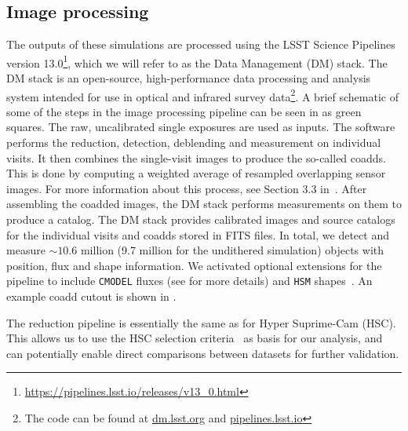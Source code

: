 \documentclass[\docopts]{\docclass}
\begin{document}
\subsection{Image processing}
\label{sec:image_processing_pipeline}

The outputs of these simulations are processed using the LSST Science Pipelines~\citep{Overview,ScienceBook,WhitePaper,2015arXiv151207914J,2018PASJ...70S...5B} version 13.0\footnote{\url{https://pipelines.lsst.io/releases/v13_0.html}}, which we will refer to as the Data Management (DM) stack. The DM stack is an open-source, high-performance data processing and analysis system intended for use in optical and infrared survey data\footnote{The code can be found at \url{dm.lsst.org} and \url{pipelines.lsst.io}}. A brief schematic of some of the steps in the image processing pipeline can be seen in  as green squares. The raw, uncalibrated single exposures are used as inputs. The software performs the reduction, detection, deblending and measurement on individual visits. It then combines the single-visit images to produce the so-called coadds. This is done by computing a weighted average of resampled overlapping sensor images. For more information about this process, see Section 3.3 in~\citet{2018PASJ...70S...5B}. After assembling the coadded images, the DM stack performs measurements on them to produce a catalog. The DM stack provides calibrated images and source catalogs for the individual visits and coadds stored in FITS files. In total, we detect and measure $\sim 10.6$ million  (9.7 million for the undithered simulation) objects with position, flux and shape information. We activated optional extensions for the pipeline to include \texttt{CMODEL} fluxes (see \cite{2018PASJ...70S...5B} for more details) and \texttt{HSM} shapes~\citep{2003MNRAS.343..459H,2005MNRAS.361.1287M}. An example coadd cutout is shown in .

The reduction pipeline is essentially the same as for Hyper Suprime-Cam (HSC). This allows us to use the HSC selection criteria~\citep[Sec. 5.1]{2018PASJ...70S..25M} as basis for our analysis, and can potentially enable direct comparisons between datasets for further validation.
\end{document}
